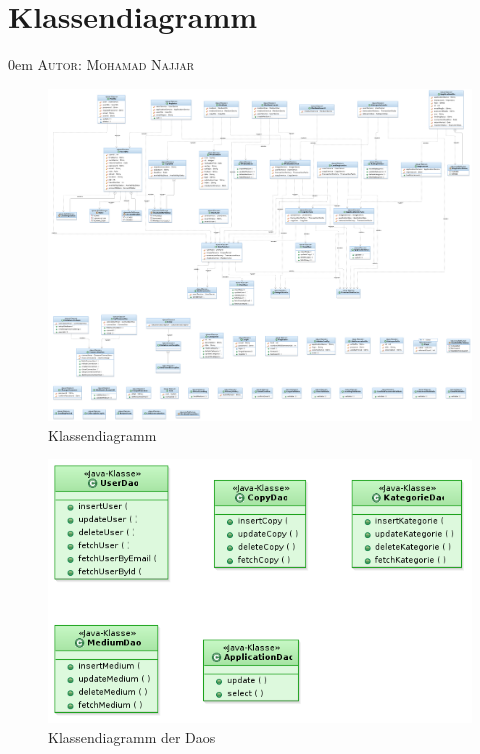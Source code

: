 \documentclass{article}
\makeatletter
\newcommand{\sectionauthor}[1]{
	{\parindent 0em \large \scshape Autor: #1 \par \nobreak \vspace*{1em}}
	\@afterheading
}
\makeatother
\begin{document}

\section{Klassendiagramm}
\sectionauthor{Mohamad Najjar}

   \begin{landscape}
    \begin{figure}
        \includegraphics[scale=0.2]{Klassendiagramm.png}
        \caption{Klassendiagramm}
        \label{fig:Klassendiagramm}
    \end{figure}
    \end{landscape}
    
    \begin{landscape}
    \begin{figure}
        \includegraphics[scale=0.6]{KlassendiagramDao.png}
        \caption{Klassendiagramm der Daos}
        \label{fig:KlassendiagramDao}
    \end{figure}
    \end{landscape}
    
\end{document}
